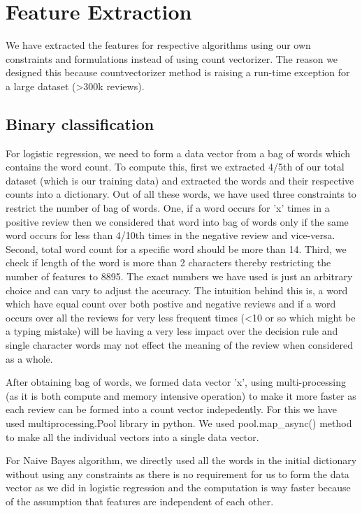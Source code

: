 \documentclass{article}
\begin{document}
\section{Feature Extraction}

We have extracted the features for respective algorithms using our own constraints and formulations instead of using count vectorizer. The reason we designed this because countvectorizer method is raising a run-time exception for a large dataset (\textgreater300k reviews).

\subsection{Binary classification}
For logistic regression, we need to form a data vector from a bag of words which contains the word count. To compute this, first we extracted 4/5th of our total dataset (which is our training data) and extracted the words and their respective counts into a dictionary. Out of all these words, we have used three constraints to restrict the number of bag of words. One, if a word occurs for 'x' times in a positive review then we considered that word into bag of words only if the same word occurs for less than 4/10th times in the negative review and vice-versa. Second, total word count for a specific word should be more than 14. Third, we check if length of the word is more than 2 characters thereby restricting the number of features to 8895. The exact numbers we have used is just an arbitrary choice and can vary to adjust the accuracy. The intuition behind this is, a word which have equal count over both postive and negative reviews and if a word occurs over all the reviews for very less frequent times (\textless10 or so which might be a typing mistake) will be having a very less impact over the decision rule and single character words may not effect the meaning of the review when considered as a whole.

After obtaining bag of words, we formed data vector 'x', using multi-processing (as it is both compute and memory intensive operation) to make it more faster as each review can be formed into a count vector indepedently. For this we have used multiprocessing.Pool library in python. We used pool.map\_async() method to make all the individual vectors into a single data vector. 

For Naive Bayes algorithm, we directly used all the words in the initial dictionary without using any constraints as there is no requirement for us to form the data vector as we did in logistic regression and the computation is way faster because of the assumption that features are independent of each other. 
\end{document}
